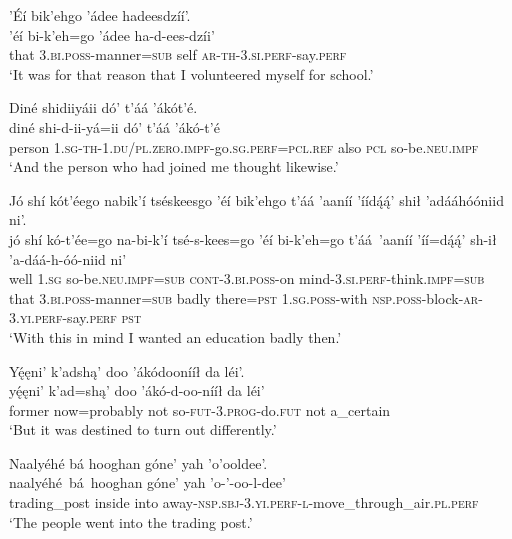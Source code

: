 \ea\label{ex:text1-30-25}
’Éí bik’ehgo ’ádee hadeesdzíí’.\\
\gll ’éí	bi-k’eh=go	’ádee	ha-d-ees-dzíi’\\
     that	3.\textsc{bi}.\textsc{poss}-manner=\textsc{sub}	self	\textsc{ar}-\textsc{th}-3.\textsc{si}.\textsc{perf}-say.\textsc{perf}\\
\glt `It was for that reason that I volunteered myself for school.'
\z

\ea\label{ex:text1-30-26}
Diné shidiiyáii dó’ t’áá ’ákót’é.\\
\gll diné	shi-d-ii-yá=ii	dó’	t’áá	’ákó-t’é\\
     person	1.\textsc{sg}-\textsc{th}-1.\textsc{du}/\textsc{pl}.\textsc{zero}.\textsc{impf}-go.\textsc{sg}.\textsc{perf}=\textsc{pcl}.\textsc{ref}	also	\textsc{pcl}	so-be.\textsc{neu}.\textsc{impf}\\
\glt `And the person who had joined me thought likewise.'
\z

\ea\label{ex:text1-30-27}
Jó shí kót’éego nabik’í tséskeesgo ’éí bik’ehgo t’áá ’aaníí ’íídą́ą́’ shił ’adááhóóniid ni’.\\
\gll jó	shí	kó-t’ée=go	na-bi-k’í	tsé-s-kees=go	’éí	bi-k’eh=go	t’áá~{’aaníí}	’íí=dą́ą́’	sh-ił	’a-dáá-h-óó-niid	ni’\\
     well	1.\textsc{sg}	so-be.\textsc{neu}.\textsc{impf}=\textsc{sub}	\textsc{cont}-3.\textsc{bi}.\textsc{poss}-on	mind-3.\textsc{si}.\textsc{perf}-think.\textsc{impf}=\textsc{sub}	that	3.\textsc{bi}.\textsc{poss}-manner=\textsc{sub}	badly	there=\textsc{pst}	1.\textsc{sg}.\textsc{poss}-with	\textsc{nsp}.\textsc{poss}-block-\textsc{ar}-3.\textsc{yi}.\textsc{perf}-say.\textsc{perf}	\textsc{pst}\\
\glt `With this in mind I wanted an education badly then.'
\z

\ea\label{ex:text1-30-28}
Yę́ęni’ k’adshą’ doo ’ákódoonííł da léi’.\\
\gll yę́ęni’	k’ad=shą’	doo	’ákó-d-oo-nííł	da	léi’\\
     former	now=probably	not	so-\textsc{fut}-3.\textsc{prog}-do.\textsc{fut}	not	a\_certain\\
\glt `But it was destined to turn out differently.'
\z

\ea\label{ex:text1-31-1}
Naalyéhé bá hooghan góne’ yah ’o’ooldee’.\\
\gll naalyéhé~bá~{hooghan}	góne’	yah	’o-’-oo-l-dee’\\
     trading\_post	inside	into	away-\textsc{nsp}.\textsc{sbj}-3.\textsc{yi}.\textsc{perf}-\textsc{l}-move\_through\_air.\textsc{pl}.\textsc{perf}\\
\glt `The people went into the trading post.'
\z

